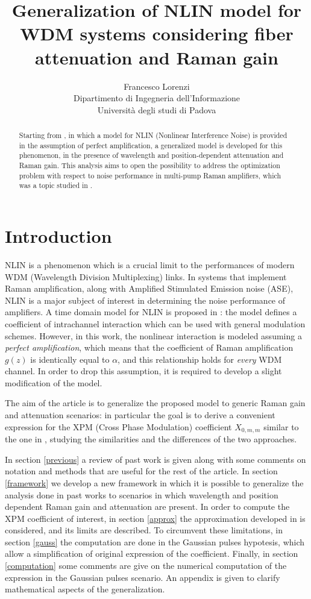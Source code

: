 \documentclass[10pt, lettersize, journal, onecolumn]{IEEEtran}
\title{Generalization of NLIN model for WDM systems considering fiber attenuation and Raman gain}
\author{Francesco Lorenzi  \vspace{2pt}\\  {\footnotesize Dipartimento di Ingegneria dell'Informazione\\ \vspace{-5pt} Università degli studi di Padova}}
\begin{document}
\maketitle


\begin{abstract}
Starting from \cite{Dar_2013}, in which a model for NLIN (Nonlinear Interference Noise) is provided in the assumption of perfect amplification, a generalized model is developed for this phenomenon, in the presence of wavelength and position-dependent attenuation and Raman gain. This analysis aims to open the possibility to address the optimization problem with respect to noise performance in multi-pump Raman amplifiers, which was a topic studied in \cite{Marcon_2021}.
\end{abstract}
\section{Introduction}
NLIN is a phenomenon which is a crucial limit to the performances of modern WDM (Wavelength Division Multiplexing) links. In systems that implement Raman amplification, along with Amplified Stimulated Emission noise (ASE), NLIN is a major subject of interest in determining the noise performance of amplifiers. A time domain model for NLIN is proposed in \cite{Dar_2013}: the model defines a coefficient of intrachannel interaction which can be used with general modulation schemes. However, in this work, the nonlinear interaction is modeled assuming a \textit{perfect amplification}, which means that the coefficient of Raman amplification $g(z)$ is identically equal to $\alpha$, and this relationship holds for \textit{every} WDM channel.
In order to drop this assumption, it is required to develop a slight modification of the model.

The aim of the article is to generalize the proposed model to generic Raman gain and attenuation scenarios: in particular the goal is to derive a convenient expression for the XPM (Cross Phase Modulation) coefficient $X_{0, m, m}$ similar to the one in \cite{Dar_2013}, studying the similarities and the differences of the two approaches.

In section \ref{previous} a review of past work is given along with some comments on notation and methods that are useful for the rest of the article.
In section \ref{framework} we develop a new framework in which it is possible to generalize the analysis done in past works to scenarios in which wavelength and position dependent Raman gain and attenuation are present.
In order to compute the XPM coefficient of interest, in section \ref{approx} the approximation developed in \cite{Dar_2013} is considered, and its limits are described.
To circumvent these limitations, in section \ref{gauss} the computation are done in the Gaussian pulses hypotesis, which allow a simplification of original expression of the coefficient.
Finally, in section \ref{computation} some comments are give on the numerical computation of the expression in the Gaussian pulses scenario.
An appendix is given to clarify mathematical aspects of the generalization.
\end{document}
